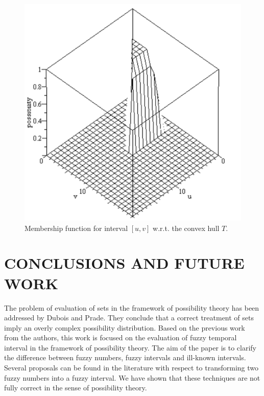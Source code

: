 \documentclass[twoside,twocolumn,a4paper]{article}
\begin{document}
\begin{figure}[h!]
  \centering
  \includegraphics[scale=0.4]{graphs/convexHull/3dpossibility.pdf}
  \caption{Membership function for interval $[u,v]$ w.r.t. the convex hull $T$.}
  \label{fig:ch-3d-possibility}
\end{figure}











\section{\label{sec:conclusions}CONCLUSIONS AND FUTURE WORK}
The problem of evaluation of sets in the framework of possibility theory has been addressed by Dubois and Prade. They conclude that a correct treatment of sets imply an overly complex possibility distribution. Based on the previous work from the authors, this work is focused on the evaluation of fuzzy temporal interval in the framework of possibility theory. The aim of the paper is to clarify the difference between fuzzy numbers, fuzzy intervals and ill-known intervals. Several proposals can be found in the literature with respect to transforming two fuzzy numbers into a fuzzy interval. We have shown that these techniques are not fully correct in the sense of possibility theory.\\
\end{document}

